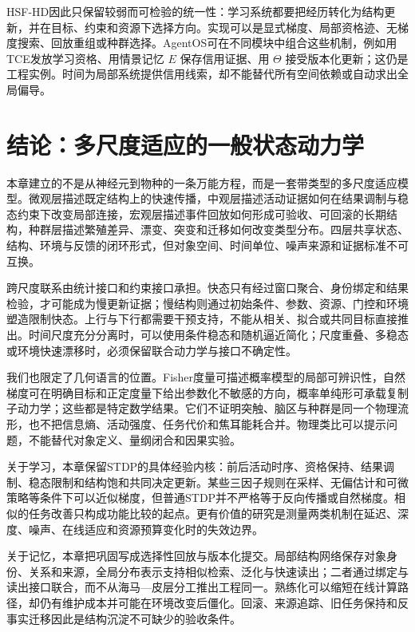 HSF-HD因此只保留较弱而可检验的统一性：学习系统都要把经历转化为结构更新，并在目标、约束和资源下选择方向。实现可以是显式梯度、局部资格迹、无梯度搜索、回放重组或种群选择。AgentOS可在不同模块中组合这些机制，例如用TCE发放学习资格、用情景记忆 $E$ 保存信用证据、用 $\Theta$ 接受版本化更新；这仍是工程实例。时间为局部系统提供信用线索，却不能替代所有空间依赖或自动求出全局偏导。

\section{结论：多尺度适应的一般状态动力学}
\label{sec:conclusion_geometric_grand_unification}

本章建立的不是从神经元到物种的一条万能方程，而是一套带类型的多尺度适应模型。微观层描述既定结构上的快速传播，中观层描述活动证据如何在结果调制与稳态约束下改变局部连接，宏观层描述事件回放如何形成可验收、可回滚的长期结构，种群层描述繁殖差异、漂变、突变和迁移如何改变类型分布。四层共享状态、结构、环境与反馈的闭环形式，但对象空间、时间单位、噪声来源和证据标准不可互换。

跨尺度联系由统计接口和约束接口承担。快态只有经过窗口聚合、身份绑定和结果检验，才可能成为慢更新证据；慢结构则通过初始条件、参数、资源、门控和环境塑造限制快态。上行与下行都需要干预支持，不能从相关、拟合或共同目标直接推出。时间尺度充分分离时，可以使用条件稳态和随机逼近简化；尺度重叠、多稳态或环境快速漂移时，必须保留联合动力学与接口不确定性。

我们也限定了几何语言的位置。Fisher度量可描述概率模型的局部可辨识性，自然梯度可在明确目标和正定度量下给出参数化不敏感的方向，概率单纯形可承载复制子动力学；这些都是特定数学结果。它们不证明突触、脑区与种群是同一个物理流形，也不把信息熵、活动强度、任务代价和焦耳能耗合并。物理类比可以提示问题，不能替代对象定义、量纲闭合和因果实验。

关于学习，本章保留STDP的具体经验内核：前后活动时序、资格保持、结果调制、稳态限制和结构饱和共同决定更新。某些三因子规则在采样、无偏估计和可微策略等条件下可以近似梯度，但普通STDP并不严格等于反向传播或自然梯度。相似的任务改善只构成功能比较的起点。更有价值的研究是测量两类机制在延迟、深度、噪声、在线适应和资源预算变化时的失效边界。

关于记忆，本章把巩固写成选择性回放与版本化提交。局部结构网络保存对象身份、关系和来源，全局分布表示支持相似检索、泛化与快速读出；二者通过绑定与读出接口联合，而不从海马—皮层分工推出工程同一。熟练化可以缩短在线计算路径，却仍有维护成本并可能在环境改变后僵化。回滚、来源追踪、旧任务保持和反事实迁移因此是结构沉淀不可缺少的验收条件。

